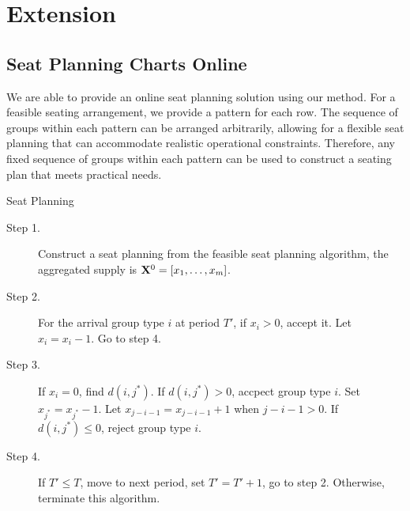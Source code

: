 
\section{Extension}

\subsection{Seat Planning Charts Online}
We are able to provide an online seat planning solution using our method. For a feasible seating arrangement, we provide a pattern for each row. The sequence of groups within each pattern can be arranged arbitrarily, allowing for a flexible seat planning that can accommodate realistic operational constraints. Therefore, any fixed sequence of groups within each pattern can be used to construct a seating plan that meets practical needs.

\begin{algorithm}[H]
  \caption{Seat Planning}\label{seat_online}
  \begin{description}
    \item[Step 1.] Construct a seat planning from the feasible seat planning algorithm, the aggregated supply is $\mathbf{X}^{0} = [x_1,\ldots,x_{m}]$.
    \item[Step 2.] For the arrival group type $i$ at period $T{'}$, if $x_{i} > 0$, accept it. Let $x_{i} = x_{i} -1$. Go to step 4.
    \item[Step 3.] If $x_{i} = 0$, find $d(i,j^{*})$. If $d(i,j^{*})>0$, accpect group type $i$. Set $x_{j^{*}} = x_{j^{*}} -1$. Let $x_{j-i-1} = x_{j-i-1} + 1$ when $j-i-1>0$. If $d(i,j^{*}) \leq 0$, reject group type $i$.
    \item[Step 4.] If $T{'} \leq T$, move to next period, set $T{'} = T{'}+1$, go to step 2. Otherwise, terminate this algorithm.
  \end{description}
\end{algorithm}





